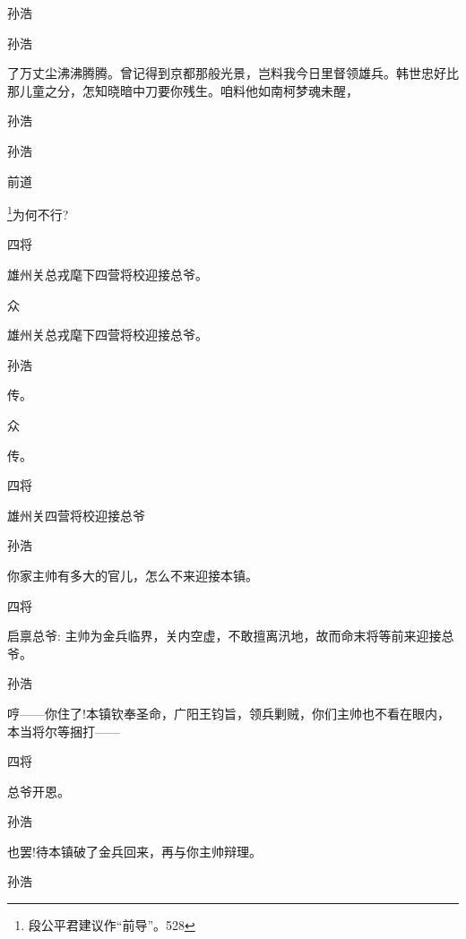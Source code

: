 {{{孙浩\hspace{30pt}~

 }

{孙浩

了万丈尘沸沸腾腾。曾记得到京都那般光景，岂料我今日里督领雄兵。韩世忠好比那儿童之分，怎知晓暗中刀要你残生。咱料他如南柯梦魂未醒， }

{孙浩\hspace{30pt}~


{孙浩

前道}\footnote{ 段公平君建议作``前导''。{528}}{为何不行?}

{四将\hspace{30pt}~

雄州关总戎麾下四营将校迎接总爷。}

{众\hspace{40pt}~

雄州关总戎麾下四营将校迎接总爷。}

{孙浩\hspace{30pt}~

传。}

{众\hspace{40pt}~

传。}

{四将\hspace{30pt}~

雄州关四营将校迎接总爷}

{孙浩\hspace{30pt}~

你家主帅有多大的官儿，怎么不来迎接本镇。}

{四将

启禀总爷: 主帅为金兵临界，关内空虚，不敢擅离汛地，故而命末将等前来迎接总爷。}

{孙浩

哼------你住了!本镇钦奉圣命，广阳王钧旨，领兵剿贼，你们主帅也不看在眼内，本当将尔等捆打------}

{四将\hspace{30pt}~

总爷开恩。}

{孙浩\hspace{30pt}~

也罢!待本镇破了金兵回来，再与你主帅辩理。}

{孙浩\hspace{30pt}~

}}}}
